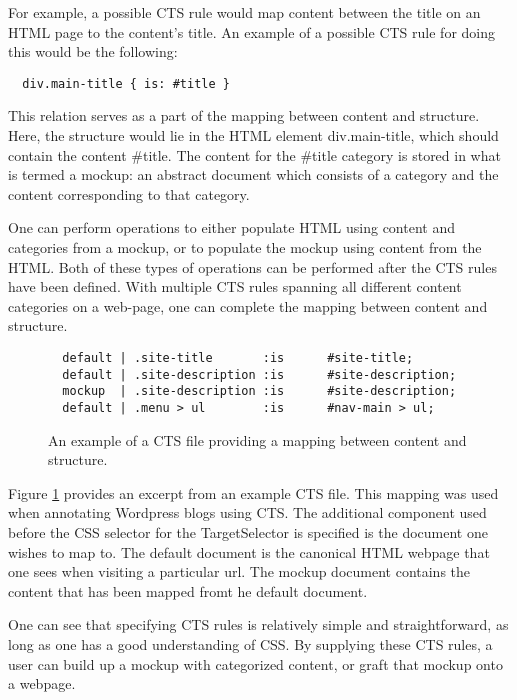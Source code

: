 \documentclass[12pt]{article}
\begin{document}
For example, a possible CTS rule would map content between the title on an HTML page to the content's title. An example of a possible CTS rule for doing this would be the following:

\begin{lstlisting}
  div.main-title { is: #title }
\end{lstlisting}

This relation serves as a part of the mapping between content and structure. Here, the structure would lie in the HTML element div.main-title, which should contain the content \#title. The content for the \#title category is stored in what is termed a mockup: an abstract document which consists of a category and the content corresponding to that category.

One can perform operations to either populate HTML using content and categories from a mockup, or to populate the mockup using content from the HTML. Both of these types of operations can be performed after the CTS rules have been defined. With multiple CTS rules spanning all different content categories on a web-page, one can complete the mapping between content and structure.

\begin{figure}
  \begin{lstlisting}
  default | .site-title       :is      #site-title;
  default | .site-description :is      #site-description;
  mockup  | .site-description :is      #site-description;
  default | .menu > ul        :is      #nav-main > ul;
  \end{lstlisting}
  \caption{\label{fig:cts-file}An example of a CTS file providing a mapping between content and structure.}
\end{figure}

Figure \ref{fig:cts-file} provides an excerpt from an example CTS file. This mapping was used when annotating Wordpress blogs using CTS. The additional component used before the CSS selector for the TargetSelector is specified is the document one wishes to map to. The default document is the canonical HTML webpage that one sees when visiting a particular url. The mockup document contains the content that has been mapped fromt he default document.

One can see that specifying CTS rules is relatively simple and straightforward, as long as one has a good understanding of CSS. By supplying these CTS rules, a user can build up a mockup with categorized content, or graft that mockup onto a webpage.
\end{document}
